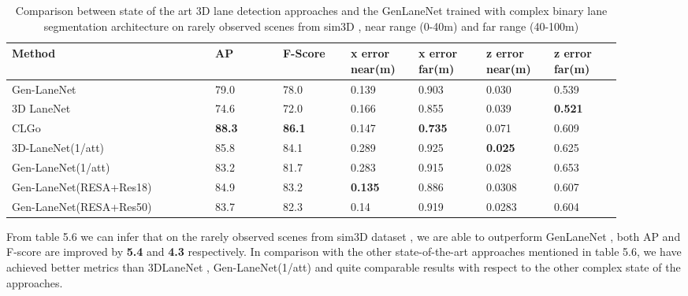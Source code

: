         \begin{table}[htbp]
    \centering
    \caption{Comparison between state of the art 3D lane detection approaches and the GenLaneNet \cite{Guo_2018_ECCV} trained with complex binary lane segmentation architecture on rarely observed scenes from sim3D \cite{guo2020gen}, near range (0-40m) and far range (40-100m)}
    \begin{tabular}{|p{0.3\linewidth}|p{0.1\linewidth}|p{0.1\linewidth}|p{0.1\linewidth}|p{0.1\linewidth}|p{0.1\linewidth}|p{0.1\linewidth}|}
    \hline
        \textbf{Method} & \textbf{AP} & \textbf{F-Score} & \textbf{x error near(m)} & \textbf{x error far(m)} & \textbf{z error near(m)} & \textbf{z error far(m)} \\ \hline
        Gen-LaneNet\cite{guo2020gen} & 79.0 & 78.0 & 0.139 & 0.903 & 0.030 & 0.539 \\ \hline
        3D LaneNet\cite{DBLP:journals/corr/abs-1811-10203} & 74.6 & 72.0 & 0.166 & 0.855 & 0.039 &\textbf{ 0.521} \\ \hline
        CLGo\cite{DBLP:journals/corr/abs-2112-15351} &\textbf{ 88.3} &\textbf{ 86.1} & 0.147 & \textbf{0.735} & 0.071 & 0.609 \\ \hline
        3D-LaneNet(1/att)\cite{9506296} & 85.8 & 84.1 & 0.289 & 0.925 &\textbf{ 0.025} & 0.625 \\ \hline
        Gen-LaneNet(1/att)\cite{9506296} & 83.2 & 81.7 & 0.283 & 0.915 & 0.028 & 0.653 \\ \hline
        Gen-LaneNet(RESA+Res18) &  84.9 & 83.2 &\textbf{ 0.135} & 0.886 & 0.0308 & 0.607 \\ \hline
        Gen-LaneNet(RESA+Res50) & 83.7 & 82.3 & 0.14 & 0.919 & 0.0283 & 0.604 \\ \hline
    \end{tabular}
\end{table}
    
     From table 5.6 we can infer that on the rarely observed scenes from sim3D dataset \cite{guo2020gen}, we are able to outperform GenLaneNet \cite{guo2020gen}, both AP and F-score are improved by \textbf{5.4} and \textbf{4.3} respectively. In comparison with the other state-of-the-art approaches mentioned in table 5.6, we have achieved better metrics than 3DLaneNet \cite{DBLP:journals/corr/abs-1811-10203}, Gen-LaneNet(1/att) \cite{9506296} and quite comparable results with respect to the other complex state of the approaches. 
    
